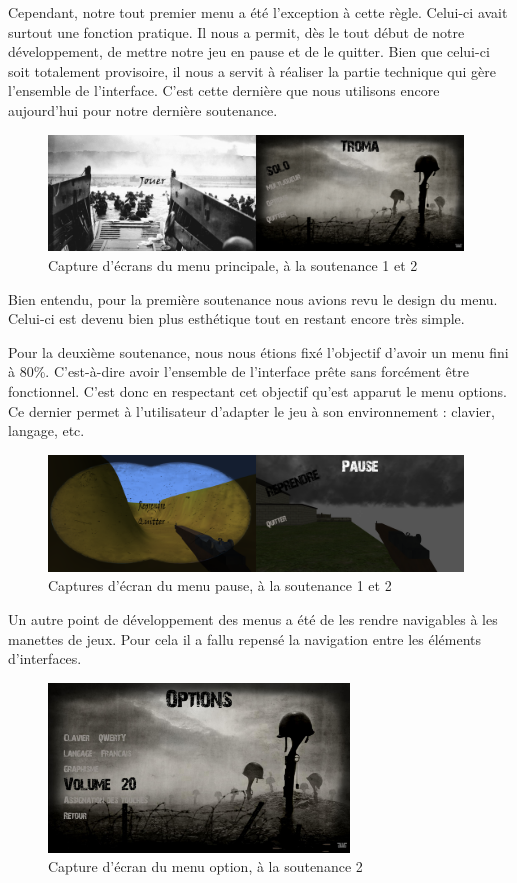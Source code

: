 \documentclass[11pt]{report}
\begin{document}
Cependant, notre tout premier menu a été l'exception à cette règle. Celui-ci avait surtout une fonction pratique. Il nous a permit, dès le tout début de notre développement, de mettre notre jeu en pause et de le quitter. Bien que celui-ci soit totalement provisoire, il nous a servit à réaliser la partie technique qui gère l'ensemble de l'interface. C'est cette dernière que nous utilisons encore aujourd'hui pour notre dernière soutenance.

\begin{figure}[htbp]
\centering
\includegraphics[width=11cm]{main-menu-1et2.png}
\caption{Capture d'écrans du menu principale, à la soutenance 1 et 2}
\end{figure}

Bien entendu, pour la première soutenance nous avions revu le design du menu. Celui-ci est devenu bien plus esthétique tout en restant encore très simple.

Pour la deuxième soutenance, nous nous étions fixé l'objectif d'avoir un menu fini à 80\%. C'est-à-dire avoir l'ensemble de l'interface prête sans forcément être fonctionnel. C'est donc en respectant cet objectif qu'est apparut le menu options. Ce dernier permet à l'utilisateur d'adapter le jeu à son environnement : clavier, langage, etc.

\begin{figure}[htbp]
\centering
\includegraphics[width=11cm]{menu-pause-1et2.png}
\caption{Captures d'écran du menu pause, à la soutenance 1 et 2}
\end{figure}

Un autre point de développement des menus a été de les rendre navigables à les manettes de jeux. Pour cela il a fallu repensé la navigation entre les éléments d'interfaces.

\begin{figure}[htbp]
\centering
\includegraphics[width=8cm]{option-menu-2.jpg}
\caption{Capture d'écran du menu option, à la soutenance 2}
\end{figure}
\end{document}
